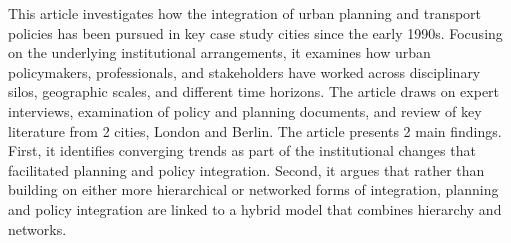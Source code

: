 This article investigates how the integration of urban planning and transport policies has been pursued in key case study cities since the early 1990s. Focusing on the underlying institutional arrangements, it examines how urban policymakers, professionals, and stakeholders have worked across disciplinary silos, geographic scales, and different time horizons. The article draws on expert interviews, examination of policy and planning documents, and review of key literature from 2 cities, London and Berlin. The article presents 2 main findings. First, it identifies converging trends as part of the institutional changes that facilitated planning and policy integration. Second, it argues that rather than building on either more hierarchical or networked forms of integration, planning and policy integration are linked to a hybrid model that combines hierarchy and networks.